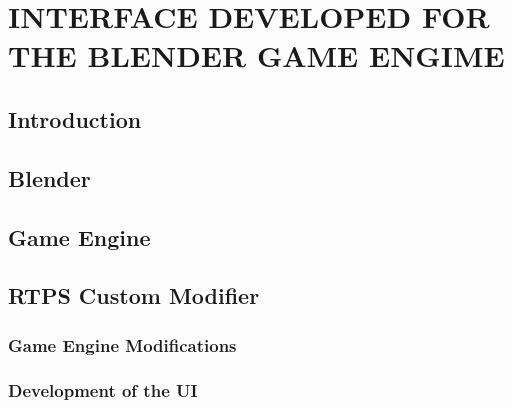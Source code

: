 \chapter{INTERFACE DEVELOPED FOR THE BLENDER GAME ENGIME}

\section{Introduction}

\section{Blender}

\section{Game Engine}

\section{RTPS Custom Modifier}

\subsection{Game Engine Modifications}

\subsection{Development of the UI}

